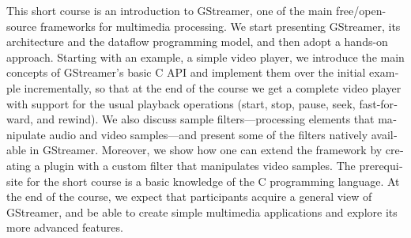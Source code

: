 \begin{otherlanguage}{english}
  This short course is an introduction to GStreamer, one of the main
  free/open-source frameworks for multimedia processing.  We start
  presenting GStreamer, its architecture and the dataflow programming
  model, and then adopt a hands-on approach.  Starting with an example, a
  simple video player, we introduce the main concepts of GStreamer’s basic C
  API and implement them over the initial example incrementally, so that at
  the end of the course we get a complete video player with support for
  the usual playback operations (start, stop, pause, seek, fast-forward,
  and rewind).  We also discuss sample filters---processing elements that
  manipulate audio and video samples---and present some of the filters
  natively available in GStreamer.  Moreover, we show how one can extend the
  framework by creating a plugin with a custom filter that manipulates
  video samples.  The prerequisite for the short course is a basic
  knowledge of the C programming language.  At the end of the course, we expect
  that participants acquire a general view of GStreamer, and be able to create
  simple multimedia applications and explore its more advanced features.
\end{otherlanguage}
